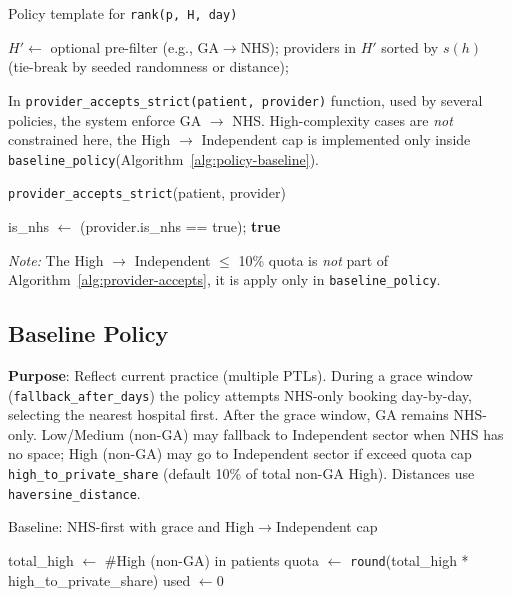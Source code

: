\documentclass[ %
                    author={Nattanan Nawakitbamrung},
                supervisor={Dr. Sébastien Rochat},
                    degree={MSc},
                     title={Developing and Evaluating the Impact of a Single Patient Treatment List (PTL) for an NHS Integrated Care System},
                  subtitle={},
                      type={},
                      year={2025}]{dissertation}
\begin{document}
\begin{algorithm}[htbp]
\caption{Policy template for \texttt{rank(p, H, day)}}
\label{alg:policy-template}
$H' \leftarrow$ optional pre-filter (e.g., GA$\rightarrow$NHS);
\Return providers in $H'$ sorted by $s(h)$ (tie-break by seeded randomness or distance);
\end{algorithm}

\noindent
In \texttt{provider\_accepts\_strict(patient, provider)} function, used by several policies, the system enforce GA $\rightarrow$ NHS. High-complexity cases are \emph{not} constrained here, the High $\rightarrow$ Independent cap is implemented only inside \texttt{baseline\_policy}(Algorithm~\ref{alg:policy-baseline}).

\begin{algorithm}[htbp]
\caption{\texttt{provider\_accepts\_strict}(patient, provider)}
\label{alg:provider-accepts}
is\_nhs $\leftarrow$ (provider.is\_nhs == true);
\Return \textbf{true}
\end{algorithm}

\noindent\emph{Note:} The High $\rightarrow$ Independent $\leq$ 10\% quota is \emph{not} part of Algorithm~\ref{alg:provider-accepts}, it is apply only in \texttt{baseline\_policy}.

\subsection{Baseline Policy}
\textbf{Purpose}: Reflect current practice (multiple PTLs). During a grace window (\texttt{fallback\_after\_days}) the policy attempts NHS-only booking day-by-day, selecting the nearest hospital first. After the grace window, GA remains NHS-only. Low/Medium (non-GA) may fallback to Independent sector when NHS has no space; High (non-GA) may go to Independent sector if exceed quota cap \texttt{high\_to\_private\_share} (default 10\% of total non-GA High). Distances use \texttt{haversine\_distance}.

\begin{algorithm}[htbp]
\caption{Baseline: NHS-first with grace and High$\rightarrow$Independent cap}
\label{alg:policy-baseline}
total\_high $\leftarrow$ \#High (non-GA) in patients\;
quota $\leftarrow$ \texttt{round}(total\_high * high\_to\_private\_share)\;
used $\leftarrow 0$\;
\end{algorithm}
\end{document}
